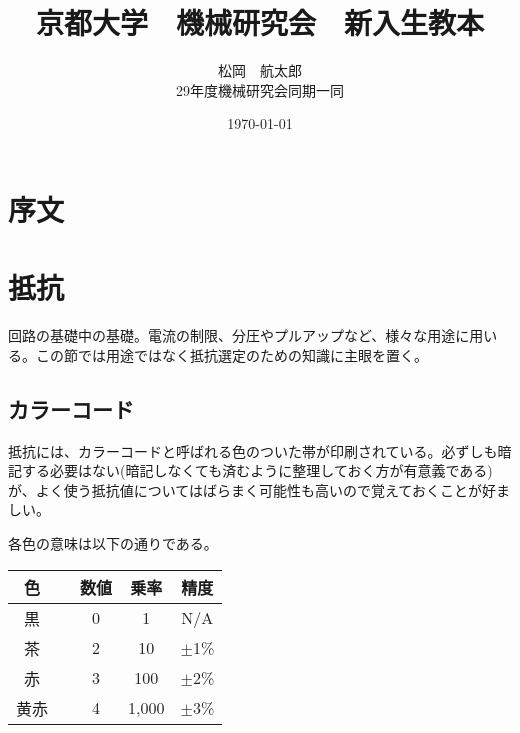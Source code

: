 \documentclass[a4paper,titlepage]{ujarticle}
\title{京都大学　機械研究会　新入生教本}
\date{\today}
\author{松岡　航太郎\\29年度機械研究会同期一同}
\begin{document}
\maketitle
\section{序文}
\section{抵抗}
回路の基礎中の基礎。電流の制限、分圧やプルアップなど、様々な用途に用いる。この節では用途ではなく抵抗選定のための知識に主眼を置く。
\subsection{カラーコード}
抵抗には、カラーコードと呼ばれる色のついた帯が印刷されている。必ずしも暗記する必要はない(暗記しなくても済むように整理しておく方が有意義である)が、よく使う抵抗値についてはばらまく可能性も高いので覚えておくことが好ましい。

各色の意味は以下の通りである。

\begin{table}[H]
	\begin{tabular}{|cc|c|c|c|}\hline
		色&&数値&乗率&精度\\ \hline
		黒&\cellcolor{black}{　}&0&1&N/A\\ \hline
		茶&\cellcolor[rgb]{0.647059,0.164706,0.164706}{　}&2&10&$\pm$1\%\\ \hline
		赤&\cellcolor{red}{　}&3&100&$\pm$2\%\\ \hline
		黄赤&\cellcolor[rgb]{0.894118,0.368627,0}{　}&4&1,000&$\pm$3\% \\ \hline
	\end{tabular}
\end{table}
\end{document}
